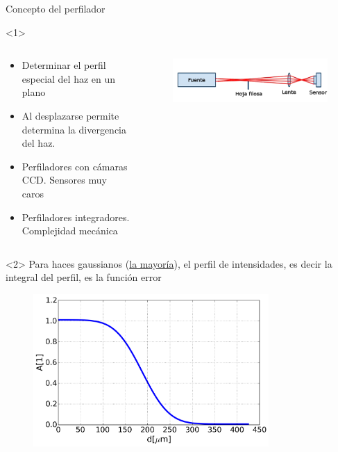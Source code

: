 \begin{frame}[fragile]{Concepto del perfilador}
    \begin{onlyenv}<1>
        \begin{columns}
            \begin{column}{0.5\textwidth}
            
                \begin{itemize}
                    \item Determinar el perfil especial del haz en un plano
                    \item Al desplazarse permite determina la divergencia del haz.
                    \item Perfiladores con cámaras CCD. Sensores muy caros
                    \item Perfiladores integradores. Complejidad mecánica
                \end{itemize}
            \end{column}
            
            \begin{column}{0.5\textwidth}
                \begin{figure}[H]
                \centering
                \includegraphics[width=\textwidth]{fig/perfilador/esquema_basico}
                \label{fig:perfilador/esquema_basico}
                \end{figure}
            \end{column}
        \end{columns}
    \end{onlyenv}

    \begin{onlyenv}<2>
        \centering
        Para haces gaussianos (\underline{la mayoría}), el perfil de intensidades, es decir la integral del perfil, es la función error

        \begin{figure}
            \centering
            \includegraphics[width=0.8\textwidth]{fig/perfilador/err_function.png}
            \label{fig:perfilador/err_function}
        \end{figure}


\end{onlyenv}
\end{frame}
